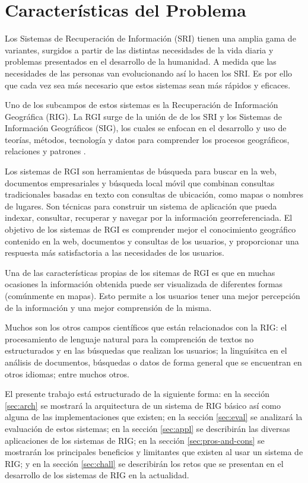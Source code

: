 \documentclass{llncs}
\begin{document}
\newpage

\section{Características del Problema}\label{sec:prob-charact}

Los Sistemas de Recuperación de Información (SRI) tienen una amplia gama de
variantes, surgidos a partir de las distintas necesidades de la vida diaria y
problemas presentados en el desarrollo de la humanidad. A medida que las
necesidades de las personas van evolucionando así lo hacen los SRI. Es por ello
que cada vez sea más necesario que estos sistemas sean más rápidos y eficaces.

Uno de los subcampos de estos sistemas es la Recuperación de Información
Geográfica (RIG). La RGI surge de la unión de de los SRI y los Sistemas de
Información Geográficos (SIG), los cuales se enfocan en el desarrollo y uso de
teorías, métodos, tecnología y datos para comprender los procesos geográficos,
relaciones y patrones \cite{chang2016}.

Los sistemas de RGI son herramientas de búsqueda para buscar en la web,
documentos empresariales y búsqueda local móvil que combinan consultas
tradicionales basadas en texto con consultas de ubicación, como mapas o nombres
de lugares. Son técnicas para construir un sistema de aplicación que pueda
indexar, consultar, recuperar y navegar por la información georreferenciada. El
objetivo de los sistemas de RGI es comprender mejor el conocimiento geográfico
contenido en la web, documentos y consultas de los usuarios, y proporcionar una
respuesta más satisfactoria a las necesidades de los usuarios.

Una de las características propias de los sitemas de RGI es que en muchas
ocasiones la información obtenida puede ser visualizada de diferentes formas
(comúnmente en mapas). Esto permite a los usuarios tener una mejor
percepción de la información y una mejor comprensión de la misma.

Muchos son los otros campos científicos que están relacionados con la RIG:
el procesamiento de lenguaje natural para la comprención de textos no
estructurados y en las búsquedas que realizan los usuarios; la linguísitca en
el análisis de documentos, búsquedas o datos de forma general que se encuentran
en otros idiomas; entre muchos otros.

El presente trabajo está estructurado de la siguiente forma: en la sección
\ref{sec:arch} se mostrará la arquitectura de un sistema de RIG básico así
como alguna de las implementaciones que existen; en la sección \ref{sec:eval} se
analizará la evaluación de estos sistemas; en la sección \ref{sec:appl} se
describirán las diversas aplicaciones de los sistemas de RIG; en la sección
\ref{sec:pros-and-cons} se mostrarán los principales beneficios y limitantes
que existen al usar un sistema de RIG; y en la sección \ref{sec:chall} se
describirán los retos que se presentan en el desarrollo de los sistemas de RIG
en la actualidad.
\end{document}

